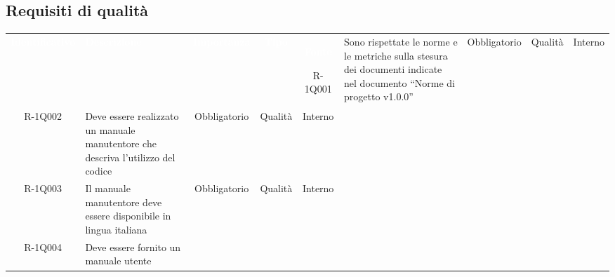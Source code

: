 

\subsection{Requisiti di qualità} 


\begin{tabularx}{\textwidth}{cXccc}
	
	\rowcolor{greySWEight}
	\textcolor{white}{\textbf{Identificativo}} &
	\textcolor{white}{\textbf{Descrizione}}&
	\textcolor{white}{\textbf{Importanza}}&
	\textcolor{white}{\textbf{Tipo}}&
	\textcolor{white}{\textbf{Fonte}}\endhead
	
	R-1Q001 &
	
	Sono rispettate le norme e le metriche sulla stesura dei documenti indicate nel documento “Norme di progetto v1.0.0” &
	
	Obbligatorio &
	
	Qualità &
	
	Interno \\
	R-1Q002 &
	
	Deve essere realizzato un manuale manutentore che descriva l’utilizzo del codice &
	
	Obbligatorio &
	
	Qualità &
	
	Interno \\
	R-1Q003 &
	
	Il manuale manutentore deve essere disponibile in lingua italiana &
	
	Obbligatorio &
	
	Qualità &
	
	Interno \\
	R-1Q004 &
	
	Deve essere fornito un manuale utente  &
	

\end{tabularx}
